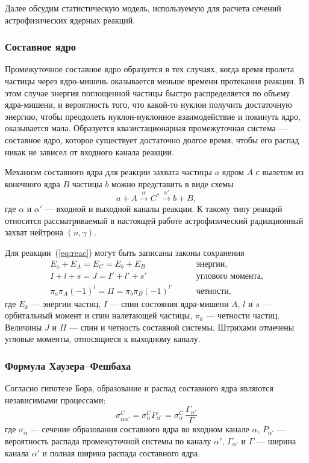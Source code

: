 Далее обсудим статистическую модель, используемую для расчета сечений астрофизических ядерных реакций.

\subsubsection{Составное ядро}
Промежуточное составное ядро образуется в тех случаях, когда время пролета частицы через ядро-мишень оказывается меньше времени протекания реакции. В этом случае энергия поглощенной частицы быстро распределяется по объему ядра-мишени, и вероятность того, что какой-то нуклон получить достаточную энергию, чтобы преодолеть нуклон-нуклонное взаимодействие и покинуть ядро, оказывается мала. Образуется квазистационарная промежуточная система --- составное ядро, которое существует достаточно долгое время, чтобы его распад никак не зависел от входного канала реакции.

Механизм составного ядра для реакции захвата частицы $a$ ядром $A$ с вылетом из конечного ядра $B$ частицы $b$ можно представить в виде схемы
\begin{equation}
a + A \xrightarrow{\alpha} C^* \xrightarrow{\alpha'} b + B,
\label{eq:reac}
\end{equation}
где $\alpha$ и $\alpha'$ --- входной и выходной каналы реакции. К такому типу реакций относится рассматриваемый в настоящей работе астрофизический радиационный захват нейтрона $(n,\gamma)$. 

Для реакции~(\ref{eq:reac}) могут быть записаны законы сохранения
\begin{equation}
\begin{aligned}
E_a + E_A = E_C = E_b + E_B& \qquad \text{энергии,}\\
I + l + s = J = I' + l' + s'& \qquad \text{углового момента,}\\
\pi_a \pi_A (-1)^l = \Pi = \pi_b \pi_B (-1)^{l'}& \qquad \text{четности,}
\end{aligned}
\end{equation}
где $E_k$ --- энергии частиц, $I$ --- спин состояния ядра-мишени $A$, $l$ и $s$ --- орбитальный момент и спин налетающей частицы, $\pi_k$ --- четности частиц. Величины $J$ и $\Pi$ --- спин и четность составной системы. Штрихами отмечены угловые моменты, относящиеся к выходному каналу.

\subsubsection{Формула Хаузера--Фешбаха}
Согласно гипотезе Бора, образование и распад составного ядра являются независимыми процессами:
\begin{equation}
\displaystyle
\sigma^C_{\alpha \alpha'} = \sigma^C_{\alpha}P_{\alpha'} = 
\sigma^C_{\alpha} \, \frac{\Gamma_{\alpha'}}{\Gamma}
\end{equation}
где $\sigma_{\alpha}$ --- сечение образования составного ядра во входном канале $\alpha$, $P_{\alpha'}$ --- вероятность распада промежуточной системы по каналу $\alpha'$, $\Gamma_{\alpha'}$ и $\Gamma$ --- ширина канала $\alpha'$ и полная ширина распада составного ядра.

